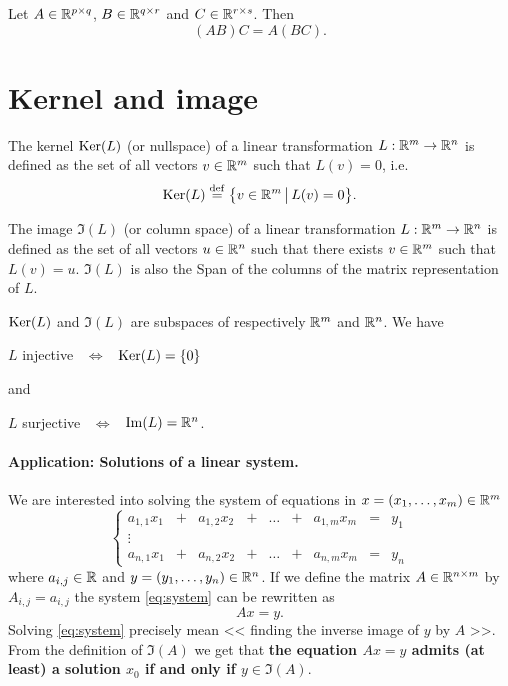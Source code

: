 \documentclass[11pt,nocut]{article}
\begin{document}
\begin{proposition}
	Let $A \in \mathbb{R}^{p \times q}$, $B \in \mathbb{R}^{q \times r}$ and $C \in \mathbb{R}^{r \times s}$. Then
	$$
	(AB) C = A (BC).
	$$
\end{proposition}


\section{Kernel and image}

\begin{definition}[Kernel]
	The kernel ${{\rm Ker}}(L)$ (or nullspace) of a linear transformation $L: \mathbb{R}^m \to \mathbb{R}^n$ is defined as the set of all vectors $v \in \mathbb{R}^m$ such that $L(v) = 0$, i.e.
	$$
	{{\rm Ker}}(L) \overset{\rm def}{=} \big\{ v \in \mathbb{R}^m \, \big| \, L(v) = 0 \big\}.
	$$
\end{definition}

\begin{definition}[Image]
	The image $\Im(L)$ (or column space) of a linear transformation $L: \mathbb{R}^m \to \mathbb{R}^n$ is defined as the set of all vectors $u \in \mathbb{R}^n$ such that there exists $v \in \mathbb{R}^m$ such that $L(v) = u$. 
	$\Im(L)$ is also the Span of the columns of the matrix representation of $L$.
\end{definition}

\begin{proposition}\label{prop:inj_sur}
	${{\rm Ker}}(L)$ and $\Im(L)$ are subspaces of respectively $\mathbb{R}^m$ and $\mathbb{R}^n$. We have
	\begin{center}
		$L$ injective \ $\Longleftrightarrow$ \ ${{\rm Ker}}(L) = \{0 \}$
	\end{center}
	and
	\begin{center}
		$L$ surjective \ $\Longleftrightarrow$ \ ${{\rm Im}}(L) = \mathbb{R}^n$.
	\end{center}
\end{proposition}

\paragraph{Application: Solutions of a linear system.}
We are interested into solving the system of equations in $x = (x_1, \dots, x_m) \in \mathbb{R}^m$
\begin{equation}\label{eq:system}
	\left\{
		\begin{array}{ccccccccc}
		a_{1,1} x_1 &+& a_{1,2} x_2 &+& \dots &+& a_{1,m} x_m &=& y_1 \\
		\vdots &&&&&&&& \\
		a_{n,1} x_1 &+& a_{n,2} x_2 &+& \dots &+& a_{n,m} x_m &=& y_n
	\end{array}
	\right.
\end{equation}
where $a_{i,j} \in \mathbb{R}$ and $y = (y_1, \dots, y_n) \in \mathbb{R}^n$. If we define the matrix $A \in \mathbb{R}^{n \times m}$ by $A_{i,j} = a_{i,j}$ the system \eqref{eq:system} can be rewritten as
$$
A x = y.
$$
Solving \eqref{eq:system} precisely mean << finding the inverse image of $y$ by $A$ >>. From the definition of $\Im(A)$ we get that 
\textbf{the equation $Ax = y$ admits (at least) a solution $x_0$ if and only if $y \in \Im(A)$}.
\\
\end{document}
